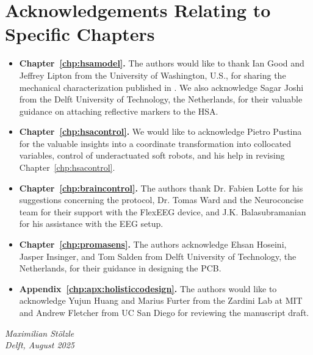 \section*{Acknowledgements Relating to Specific Chapters}
\vspace{0.3cm}

\begin{itemize}
    \item \textbf{Chapter~\ref{chp:hsamodel}.} The authors would like to thank Ian Good and Jeffrey Lipton from the University of Washington, U.S., for sharing the mechanical characterization published in \citep{good2022expanding}. We also acknowledge Sagar Joshi from the Delft University of Technology, the Netherlands, for their valuable guidance on attaching reflective markers to the HSA.
    \item \textbf{Chapter~\ref{chp:hsacontrol}.} We would like to acknowledge Pietro Pustina for the valuable insights into a coordinate transformation into collocated variables, control of underactuated soft robots, and his help in revising Chapter~\ref{chp:hsacontrol}.
    \item \textbf{Chapter~\ref{chp:braincontrol}.} The authors thank Dr. Fabien Lotte for his suggestions concerning the protocol, Dr. Tomas Ward and the Neuroconcise team for their support with the FlexEEG device, and J.K. Balasubramanian for his assistance with the EEG setup.
    \item \textbf{Chapter~\ref{chp:promasens}.} The authors acknowledge Ehsan Hoseini, Jasper Insinger, and Tom Salden from Delft University of Technology, the Netherlands, for their guidance in designing the \gls{PCB}.
    \item \textbf{Appendix~\ref{chp:apx:holisticcodesign}.} The authors would like to acknowledge Yujun Huang and Marius Furter from the Zardini Lab at MIT and Andrew Fletcher from UC San Diego for reviewing the manuscript draft.
\end{itemize}

\begin{flushright}
{\makeatletter\itshape
    Maximilian Stölzle \\
    Delft, August 2025
\makeatother}
\end{flushright}


